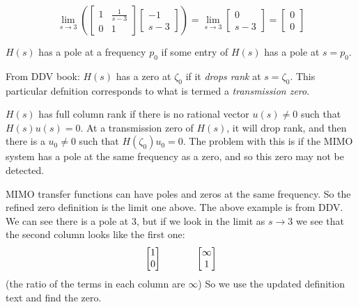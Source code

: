 \begin{equation*}
  \lim_{s\rightarrow3}
  \left(
    \begin{bmatrix}
      1 & \frac{1}{s-3} \\
      0 & 1
    \end{bmatrix}
    \begin{bmatrix}
      -1 \\
      s-3
    \end{bmatrix}
  \right)=
  \lim_{s\rightarrow3}
  \begin{bmatrix}
    0 \\
    s-3
  \end{bmatrix}=
  \begin{bmatrix}
    0 \\
    0
  \end{bmatrix}
\end{equation*}


$H(s)$ has a pole at a frequency $p_{0}$ if some entry of $H(s)$ has a pole at $s=p_{0}$.

From DDV book: $H(s)$ has a zero at $\zeta_{0}$ if it \textit{drops rank} at $s=\zeta_{0}$.
This particular defnition corresponds to what is termed a \textit{transmission zero}.

$H(s)$ has full column rank if there is no rational vector $u(s)\neq0$ such that $H(s)u(s)=0$.
At a transmission zero of $H(s)$, it will drop rank, and then there is a $u_{0}\neq0$ such that $H(\zeta_{0})u_{0}=0$.
The problem with this is if the MIMO system has a pole at the same frequency as a zero, and so this zero may not be detected.

MIMO transfer functions can have poles and zeros at the same frequency.
So the refined zero definition is the limit one above.
The above example is from DDV.\@
We can see there is a pole at 3, but if we look in the limit as $s\rightarrow3$ we see that the second column looks like the first one:
\begin{equation*}
  \begin{bmatrix}
    1 \\
    0
  \end{bmatrix}
  \hspace{0.5in}
  \begin{bmatrix}
    \infty \\
    1
  \end{bmatrix}
\end{equation*}
(the ratio of the terms in each column are $\infty$) So we use the updated definition text and find the zero.

